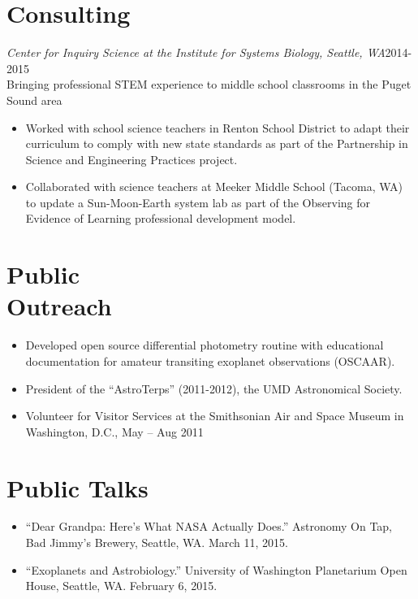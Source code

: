 \documentclass[margin]{res}
\begin{document}
\begin{resume}
\section{Consulting}
{\sl Center for Inquiry Science at the Institute for Systems Biology, Seattle, WA}\hfill2014-2015\\
Bringing professional STEM experience to middle school classrooms in the Puget Sound area
\begin{itemize}   
\item Worked with school science teachers in Renton School District to adapt their curriculum to comply with new state standards as part of the Partnership in Science and Engineering Practices project. 
\item Collaborated with science teachers at Meeker Middle School (Tacoma, WA) to update a Sun-Moon-Earth system lab as part of the Observing for Evidence of Learning professional development model.\\
\end{itemize}

\section{Public \\ Outreach}             
\begin{itemize}
\item Developed open source differential photometry routine with educational documentation for amateur transiting exoplanet observations (OSCAAR).

\item President of the ``AstroTerps'' (2011-2012), the UMD Astronomical Society.

\item Volunteer for Visitor Services at the Smithsonian Air and Space Museum in Washington, D.C., May -- Aug 2011\\
\end{itemize}


\section{Public Talks}
\begin{itemize}
\item ``Dear Grandpa: Here's What NASA Actually Does.'' Astronomy On Tap, Bad Jimmy's Brewery, Seattle, WA. March 11, 2015.

\item ``Exoplanets and Astrobiology.'' University of Washington Planetarium Open House, Seattle, WA. February 6, 2015.


\end{itemize}
\end{resume}
\end{document}
